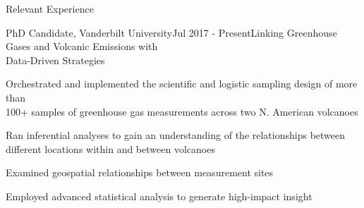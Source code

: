 \documentclass{resume} %
\begin{document}
\begin{rSection}{Relevant Experience}
\begin{rSubsection}{PhD Candidate, Vanderbilt University}{Jul 2017 - Present}{Linking Greenhouse Gases and Volcanic Emissions with \\ Data-Driven Strategies}{}
\item {Orchestrated and implemented the scientific and logistic sampling design of more than \\ 100+ samples of greenhouse gas measurements across two N. American volcanoes}
\item {Ran inferential analyses to gain an understanding of the relationships between \\ different locations within and between volcanoes}
\item {Examined geospatial relationships between measurement sites}
\item {Employed advanced statistical analysis to generate high-impact insight}

\end{rSubsection}





\end{rSection} 

\end{document}
